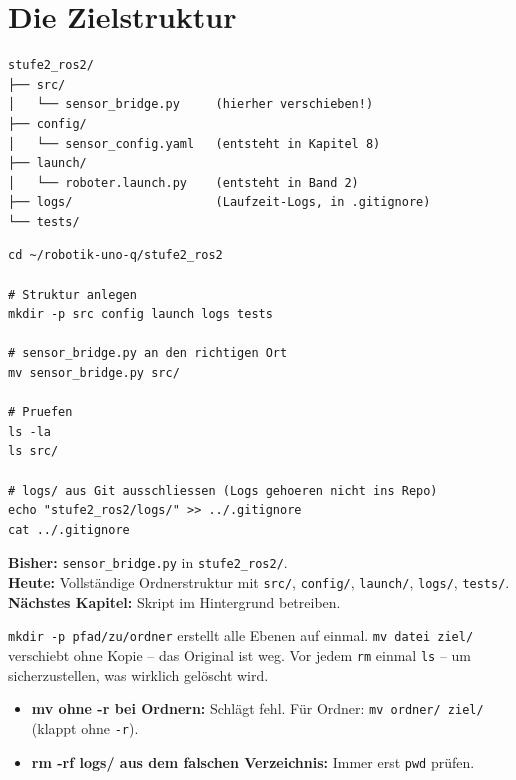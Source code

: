 \section{Die Zielstruktur}

\begin{lstlisting}[style=text]
stufe2_ros2/
├── src/
│   └── sensor_bridge.py     (hierher verschieben!)
├── config/
│   └── sensor_config.yaml   (entsteht in Kapitel 8)
├── launch/
│   └── roboter.launch.py    (entsteht in Band 2)
├── logs/                    (Laufzeit-Logs, in .gitignore)
└── tests/
\end{lstlisting}

\begin{loesungBox}
\begin{lstlisting}[style=bash]
cd ~/robotik-uno-q/stufe2_ros2

# Struktur anlegen
mkdir -p src config launch logs tests

# sensor_bridge.py an den richtigen Ort
mv sensor_bridge.py src/

# Pruefen
ls -la
ls src/

# logs/ aus Git ausschliessen (Logs gehoeren nicht ins Repo)
echo "stufe2_ros2/logs/" >> ../.gitignore
cat ../.gitignore
\end{lstlisting}
\end{loesungBox}

\begin{projektBox}
\textbf{Bisher:} \texttt{sensor\_bridge.py} in \texttt{stufe2\_ros2/}.\\
\textbf{Heute:} Vollständige Ordnerstruktur mit \texttt{src/},
\texttt{config/}, \texttt{launch/}, \texttt{logs/}, \texttt{tests/}.\\
\textbf{Nächstes Kapitel:} Skript im Hintergrund betreiben.
\end{projektBox}

\begin{merksatzBox}
\texttt{mkdir -p pfad/zu/ordner} erstellt alle Ebenen auf einmal.
\texttt{mv datei ziel/} verschiebt ohne Kopie -- das Original ist weg.
Vor jedem \texttt{rm} einmal \texttt{ls} -- um sicherzustellen,
was wirklich gelöscht wird.
\end{merksatzBox}

\begin{fehlerBox}
\begin{itemize}
  \item \textbf{mv ohne -r bei Ordnern:} Schlägt fehl.
        Für Ordner: \texttt{mv ordner/ ziel/} (klappt ohne \texttt{-r}).
  \item \textbf{rm -rf logs/ aus dem falschen Verzeichnis:}
        Immer erst \texttt{pwd} prüfen.
\end{itemize}
\end{fehlerBox}

